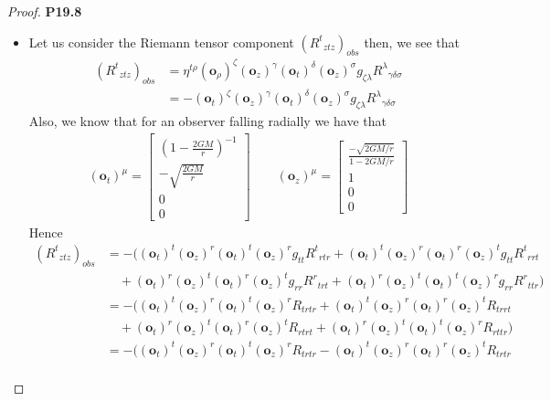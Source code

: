 \documentclass[11pt]{article}
\theoremstyle{definition}
\begin{document}
\begin{proof}{\textbf{P19.8}}
\begin{itemize}
\item [\textbf{b.}] Let us consider the Riemann tensor component
$({R^t}_{ztz})_{obs}$ then, we see that
\begin{align*}
    ({R^t}_{ztz})_{obs}
    &= \eta^{t\rho}
    (\bm{o}_\rho)^\zeta (\bm{o}_z)^\gamma (\bm{o}_t)^\delta (\bm{o}_z)^\sigma
    g_{\zeta\lambda}{R^\lambda}_{\gamma\delta\sigma} \\
    &= -(\bm{o}_t)^\zeta (\bm{o}_z)^\gamma (\bm{o}_t)^\delta (\bm{o}_z)^\sigma
    g_{\zeta\lambda}{R^\lambda}_{\gamma\delta\sigma} 
\end{align*}
Also, we know that for an observer falling radially we have that
\begin{align*}
    (\bm{o}_t)^{\mu} = \begin{bmatrix}
        \left(1 - \frac{2GM}{r}\right)^{-1}\\[7pt]
        -\sqrt{\frac{2GM}{r}}\\[7pt]
        0\\
        0
    \end{bmatrix}
    \qquad
    (\bm{o}_z)^{\mu} = \begin{bmatrix}
        \frac{-\sqrt{2GM/r}}{1 - 2GM/r}\\[7pt]
        1\\
        0\\
        0
    \end{bmatrix}
\end{align*}
Hence
\begin{align*}
    ({R^t}_{ztz})_{obs}
    &= -(
    (\bm{o}_t)^t (\bm{o}_z)^r (\bm{o}_t)^t (\bm{o}_z)^r g_{tt}{R^t}_{rtr} 
    + (\bm{o}_t)^t (\bm{o}_z)^r (\bm{o}_t)^r (\bm{o}_z)^t g_{tt}{R^t}_{rrt}\\
    &\quad
    + (\bm{o}_t)^r (\bm{o}_z)^t (\bm{o}_t)^r (\bm{o}_z)^t g_{rr}{R^r}_{trt}
    + (\bm{o}_t)^r (\bm{o}_z)^t (\bm{o}_t)^t (\bm{o}_z)^r g_{rr}{R^r}_{ttr}
    )\\[7pt]
    &= -(
    (\bm{o}_t)^t (\bm{o}_z)^r (\bm{o}_t)^t (\bm{o}_z)^r R_{trtr} 
    + (\bm{o}_t)^t (\bm{o}_z)^r (\bm{o}_t)^r (\bm{o}_z)^t R_{trrt}\\
    &\quad
    + (\bm{o}_t)^r (\bm{o}_z)^t (\bm{o}_t)^r (\bm{o}_z)^t R_{rtrt}
    + (\bm{o}_t)^r (\bm{o}_z)^t (\bm{o}_t)^t (\bm{o}_z)^r R_{rttr}
    )\\[7pt]
    &= -(
    (\bm{o}_t)^t (\bm{o}_z)^r (\bm{o}_t)^t (\bm{o}_z)^r R_{trtr} 
    - (\bm{o}_t)^t (\bm{o}_z)^r (\bm{o}_t)^r (\bm{o}_z)^t R_{trtr}\\

\end{align*}
\end{itemize}
\end{proof}
\end{document}
